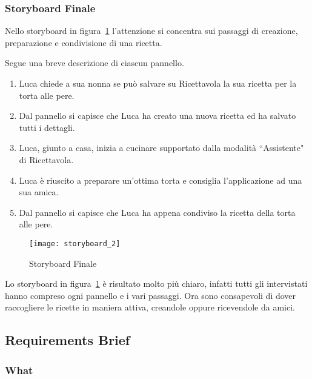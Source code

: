 \subsubsection{Storyboard Finale}

Nello storyboard in figura~\ref{fig:storyboard_2} l'attenzione si concentra sui passaggi di creazione, preparazione e condivisione di una ricetta.

Segue una breve descrizione di ciascun pannello.
\begin{enumerate}
  \item Luca chiede a sua nonna se può salvare su Ricettavola la sua ricetta per la torta alle pere.
  \item Dal pannello si capisce che Luca ha creato una nuova ricetta ed ha salvato tutti i dettagli.
  \item Luca, giunto a casa, inizia a cucinare supportato dalla modalità ``Assistente" di Ricettavola.
  \item Luca è riuscito a preparare un'ottima torta e consiglia l'applicazione ad una sua amica.
  \item Dal pannello si capisce che Luca ha appena condiviso la ricetta della torta alle pere.
\end{enumerate}

\clearpage
\begin{figure}[!ht]
  \begin{center}
    \texttt{[image: storyboard\_2]}
    \caption{Storyboard Finale}
    \label{fig:storyboard_2}
  \end{center}
\end{figure}
\clearpage

Lo storyboard in figura~\ref{fig:storyboard_2} è risultato molto più chiaro, infatti tutti gli intervistati hanno compreso ogni pannello e i vari passaggi.
Ora sono consapevoli di dover raccogliere le ricette in maniera attiva, creandole oppure ricevendole da amici.


\subsection{Requirements Brief}
\subsubsection{What}


